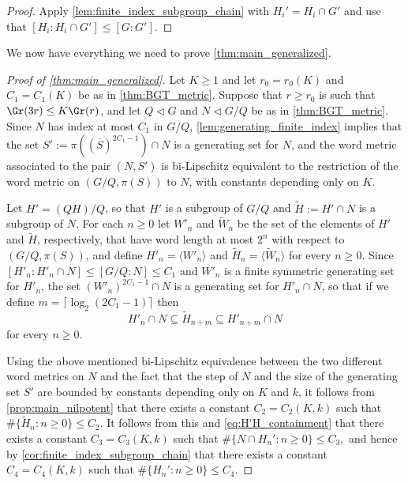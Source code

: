 \begin{proof}
Apply \cref{lem:finite_index_subgroup_chain} with $H_i'=H_i \cap G'$ and use that $[H_i:H_i \cap G']\leq [G:G']$.
\end{proof}



We now have everything we need to prove \cref{thm:main_generalized}.




\begin{proof}[Proof of \cref{thm:main_generalized}]
Let $K\geq 1$ and let $r_0=r_0(K)$ and $C_1=C_1(K)$ be as in \cref{thm:BGT_metric}. Suppose that $r\geq r_0$ is such that $\Gr(3r)\leq K \Gr(r)$, and let $Q \triangleleft G$ and $N \triangleleft G/Q$ be as in \cref{thm:BGT_metric}.
Since $N$ has index at most $C_1$ in $G/Q$, \cref{lem:generating_finite_index} implies that the set $S':=\pi((\overline{S})^{2C_1-1}) \cap N$ is a generating set for $N$, and the word metric associated to the pair $(N,S')$ is bi-Lipschitz equivalent to the restriction of the word metric on $(G/Q,\pi(S))$ to $N$, with constants depending only on $K$.

\medskip

Let $H'=(QH)/Q$, so that $H'$ is a subgroup of $G/Q$ and $\tilde H := H' \cap N$ is a subgroup of $N$. For each $n\geq 0$ let $W'_n$ and $\tilde W_n$ be the set of the elements of $H'$ and $\tilde H$, respectively, that have word length at most $2^n$ with respect to $(G/Q,\pi(S))$, and define $H'_n= \langle W'_n \rangle$ and $\tilde H_n=\langle \tilde W_n \rangle$ for every $n\geq 0$. Since $[H'_n:H'_n \cap N]\leq [G/Q:N]\leq C_1$ and $W'_n$ is a finite symmetric generating set for $H'_n$, the set $(W'_n)^{2C_1-1}\cap N$ is a generating set for $H'_n \cap N$, so that if we define $m=\lceil \log_2 (2C_1-1) \rceil$ then
\begin{equation}
\label{eq:H'H_containment}
H'_n \cap N \subseteq \tilde H_{n+m} \subseteq H'_{n+m} \cap N
\end{equation}
for every $n\geq 0$.

\medskip


   Using the above mentioned bi-Lipschitz equivalence between the two different word metrics on $N$ and the fact that the step of $N$ and the size of the generating set $S'$ are bounded by constants depending only on $K$ and $k$, it follows from \cref{prop:main_nilpotent} that there exists a constant $C_2=C_2(K,k)$ such that
$
\#\{\tilde H_n : n \geq 0 \} \leq C_2.
$
It follows from this and \eqref{eq:H'H_containment} that there 
%
exists a constant $C_3=C_3(K,k)$ such that
$
\#\{N\cap H_n' : n \geq 0 \} \leq C_3,
$
and hence by \cref{cor:finite_index_subgroup_chain} that there exists a constant $C_4=C_4(K,k)$ such that
$
\#\{ H_n' : n \geq 0 \} \leq C_4.
$


\end{proof}
